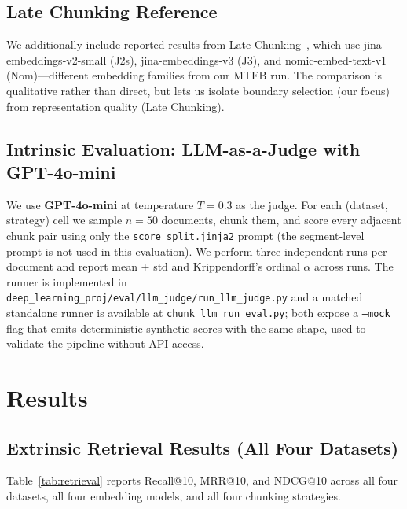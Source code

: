 \documentclass[conference]{IEEEtran}
\begin{document}
\subsection{Late Chunking Reference}

We additionally include reported results from Late
Chunking~\cite{gunther2024late}, which use jina-embeddings-v2-small (J2s),
jina-embeddings-v3 (J3), and nomic-embed-text-v1 (Nom)---different
embedding families from our MTEB run. The comparison is qualitative rather
than direct, but lets us isolate boundary selection (our focus) from
representation quality (Late Chunking).

\subsection{Intrinsic Evaluation: LLM-as-a-Judge with GPT-4o-mini}

We use \textbf{GPT-4o-mini} at temperature $T = 0.3$ as the judge.
For each (dataset, strategy) cell we sample $n = 50$ documents, chunk them,
and score every adjacent chunk pair using only the
\texttt{score\_split.jinja2} prompt (the segment-level prompt is not used
in this evaluation). We perform three independent runs per document and
report mean $\pm$ std and Krippendorff's ordinal $\alpha$ across runs. The
runner is implemented in
\texttt{deep\_learning\_proj/eval/llm\_judge/run\_llm\_judge.py} and a
matched standalone runner is available at
\texttt{chunk\_llm\_run\_eval.py}; both expose a \texttt{--mock} flag that
emits deterministic synthetic scores with the same shape, used to validate
the pipeline without API access.

\section{Results}

\subsection{Extrinsic Retrieval Results (All Four Datasets)}

Table~\ref{tab:retrieval} reports Recall@10, MRR@10, and NDCG@10 across all
four datasets, all four embedding models, and all four chunking strategies.
\end{document}
